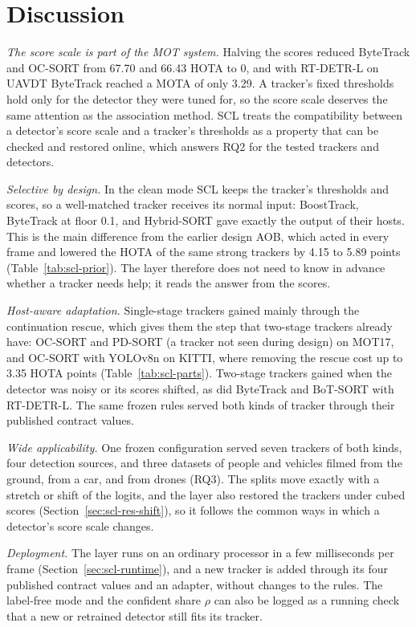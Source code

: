 \section{Discussion}\label{sec:scl-discussion}
\emph{The score scale is part of the MOT system.} Halving the scores reduced ByteTrack and OC-SORT from 67.70 and 66.43 HOTA to 0, and with RT-DETR-L on UAVDT ByteTrack reached a MOTA of only 3.29. A tracker's fixed thresholds hold only for the detector they were tuned for, so the score scale deserves the same attention as the association method. SCL treats the compatibility between a detector's score scale and a tracker's thresholds as a property that can be checked and restored online, which answers RQ2 for the tested trackers and detectors.

\emph{Selective by design.} In the clean mode SCL keeps the tracker's thresholds and scores, so a well-matched tracker receives its normal input: BoostTrack, ByteTrack at floor 0.1, and Hybrid-SORT gave exactly the output of their hosts. This is the main difference from the earlier design AOB, which acted in every frame and lowered the HOTA of the same strong trackers by 4.15 to 5.89 points (Table~\ref{tab:scl-prior}). The layer therefore does not need to know in advance whether a tracker needs help; it reads the answer from the scores.

\emph{Host-aware adaptation.} Single-stage trackers gained mainly through the continuation rescue, which gives them the step that two-stage trackers already have: OC-SORT and PD-SORT (a tracker not seen during design) on MOT17, and OC-SORT with YOLOv8n on KITTI, where removing the rescue cost up to 3.35 HOTA points (Table~\ref{tab:scl-parts}). Two-stage trackers gained when the detector was noisy or its scores shifted, as did ByteTrack and BoT-SORT with RT-DETR-L. The same frozen rules served both kinds of tracker through their published contract values.

\emph{Wide applicability.} One frozen configuration served seven trackers of both kinds, four detection sources, and three datasets of people and vehicles filmed from the ground, from a car, and from drones (RQ3). The splits move exactly with a stretch or shift of the logits, and the layer also restored the trackers under cubed scores (Section~\ref{sec:scl-res-shift}), so it follows the common ways in which a detector's score scale changes.

\emph{Deployment.} The layer runs on an ordinary processor in a few milliseconds per frame (Section~\ref{sec:scl-runtime}), and a new tracker is added through its four published contract values and an adapter, without changes to the rules. The label-free mode and the confident share $\rho$ can also be logged as a running check that a new or retrained detector still fits its tracker.

